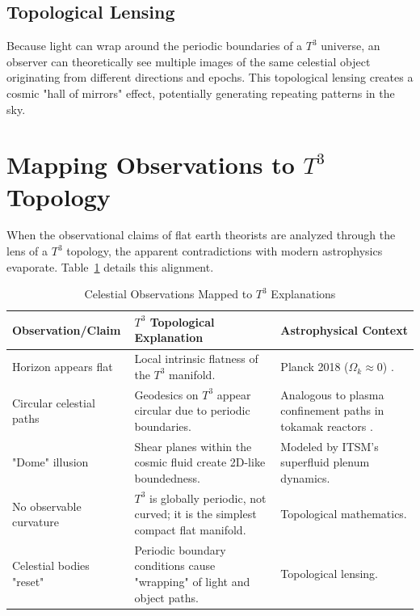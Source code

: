 \documentclass[aps,prd,11pt,onecolumn,superscriptaddress,nofootinbib,floatfix]{revtex4-2}
\begin{document}
\subsection{Topological Lensing}
Because light can wrap around the periodic boundaries of a $T^3$ universe, an observer can theoretically see multiple images of the same celestial object originating from different directions and epochs. This topological lensing creates a cosmic "hall of mirrors" effect, potentially generating repeating patterns in the sky.

\section{Mapping Observations to $T^3$ Topology}
\label{sec:mapping}

When the observational claims of flat earth theorists are analyzed through the lens of a $T^3$ topology, the apparent contradictions with modern astrophysics evaporate. Table~\ref{tab:mapping} details this alignment.

\begin{table}[h]
\centering
\caption{Celestial Observations Mapped to $T^3$ Explanations}
\label{tab:mapping}
\begin{tabular}{p{} p{} p{}}
\toprule
\textbf{Observation/Claim} & \textbf{$T^3$ Topological Explanation} & \textbf{Astrophysical Context} \\
\midrule
Horizon appears flat & Local intrinsic flatness of the $T^3$ manifold. & Planck 2018 ($\Omega_k \approx 0$) \cite{planck_2018}. \\
Circular celestial paths & Geodesics on $T^3$ appear circular due to periodic boundaries. & Analogous to plasma confinement paths in tokamak reactors \cite{iter_basis}. \\
"Dome" illusion & Shear planes within the cosmic fluid create 2D-like boundedness. & Modeled by ITSM's superfluid plenum dynamics. \\
No observable curvature & $T^3$ is globally periodic, not curved; it is the simplest compact flat manifold. & Topological mathematics. \\
Celestial bodies "reset" & Periodic boundary conditions cause "wrapping" of light and object paths. & Topological lensing. \\
\bottomrule
\end{tabular}
\end{table}
\end{document}

